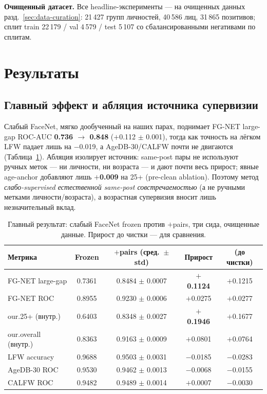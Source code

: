 \documentclass[journal]{IEEEtran}
\begin{document}
\textbf{Очищенный датасет.} Все headline-эксперименты --- на очищенных данных разд.~\ref{sec:data-curation}: 21\,427 групп личностей, 40\,586 лиц, 31\,865 позитивов; сплит train 22\,179 / val 4\,579 / test 5\,107 со сбалансированными негативами по сплитам.

\section{Результаты}\label{sec:results}
\subsection{Главный эффект и абляция источника супервизии}\label{sec:res-main}
Слабый FaceNet, мягко дообученный на наших парах, поднимает FG-NET large-gap ROC-AUC \textbf{0.736 $\rightarrow$ 0.848} ($+$0.112 $\pm$ 0.001), тогда как точность на лёгком LFW падает лишь на $-$0.019, а AgeDB-30/CALFW почти не двигаются (Таблица~\ref{tab:main}). Абляция изолирует источник: same-post пары не используют ручных меток --- ни личности, ни возраста --- и дают почти весь прирост; явные age-anchor добавляют лишь \textbf{$+$0.009} на 25+ (pre-clean ablation). Поэтому метод \emph{слабо-supervised естественной same-post совстречаемостью} (а не ручными метками личности/возраста), а возрастная супервизия вносит лишь незначительный вклад.

\begin{table}[!t]
\renewcommand{\arraystretch}{1.2}
\caption{Главный результат: слабый FaceNet frozen против $+$pairs, три сида, очищенные данные. Прирост до чистки --- для сравнения.}
\label{tab:main}
\centering
\footnotesize
\begin{tabular}{@{}lcccc@{}}
\toprule
Метрика & Frozen & $+$pairs (сред.\ $\pm$ std) & Прирост & (до чистки) \\
\midrule
FG-NET large-gap & 0.7361 & 0.8484 $\pm$ 0.0007 & \textbf{$+$0.1124} & $+$0.1215 \\
FG-NET ROC & 0.8955 & 0.9230 $\pm$ 0.0006 & $+$0.0275 & $+$0.0277 \\
our.25+ (внутр.) & 0.6403 & 0.8348 $\pm$ 0.0027 & \textbf{$+$0.1946} & $+$0.1677 \\
our.overall (внутр.) & 0.8363 & 0.9163 $\pm$ 0.0009 & $+$0.0801 & $+$0.0764 \\
LFW accuracy & 0.9688 & 0.9503 $\pm$ 0.0031 & $-$0.0185 & $-$0.0283 \\
AgeDB-30 ROC & 0.9530 & 0.9462 $\pm$ 0.0013 & $-$0.0068 & $-$0.0155 \\
CALFW ROC & 0.9482 & 0.9489 $\pm$ 0.0014 & $+$0.0007 & $-$0.0030 \\
\bottomrule
\end{tabular}
\end{table}
\end{document}
